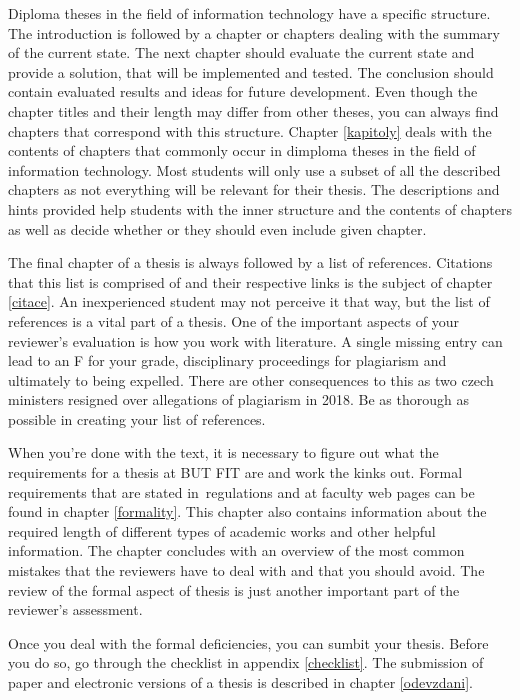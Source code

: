 Diploma theses in the field of information technology have a specific  structure. The introduction is followed by a chapter or chapters dealing with the summary of the current state. The next chapter should evaluate the current state and provide a solution, that will be implemented and tested. The conclusion should contain evaluated results and ideas for future development. Even though the chapter titles and their length may differ from other theses, you can always find chapters that correspond with this structure. Chapter \ref{kapitoly} deals with the contents of chapters that commonly occur in dimploma theses in the field of information technology. Most students will only use a subset of all the described chapters as not everything will be relevant for their thesis. The descriptions and hints provided help students with the inner structure and the contents of chapters as well as decide whether or they should even include given chapter. 

The final chapter of a thesis is always followed by a list of references. Citations that this list is comprised of and their respective links is the subject of chapter \ref{citace}. An inexperienced student may not perceive it that way, but the list of references is a vital part of a thesis. One of the important aspects of your reviewer's evaluation is how you work with literature. A single missing entry can lead to an F for your grade, disciplinary proceedings for plagiarism and ultimately to being expelled. There are other consequences to this as two czech ministers resigned over allegations of plagiarism in 2018. Be as thorough as possible in creating your list of references.

When you're done with the text, it is necessary to figure out what the requirements for a thesis at BUT FIT are and work the kinks out. Formal requirements that are stated in~regulations and at faculty web pages can be found in chapter \ref{formality}. This chapter also contains information about the required length of different types of academic works and other helpful information. The chapter concludes with an overview of the most common mistakes that the reviewers have to deal with and that you should avoid. The review of the formal aspect of thesis is just another important part of the reviewer's assessment.

Once you deal with the formal deficiencies, you can sumbit your thesis. Before you do so, go through the checklist in appendix \ref{checklist}. The submission of paper and electronic versions of a thesis is described in chapter \ref{odevzdani}.

